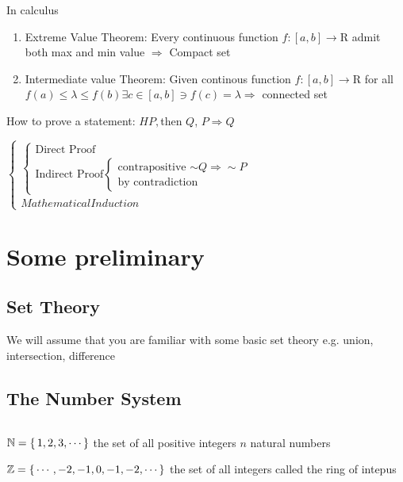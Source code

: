 


\cfoot{\thepage} %

In calculus

\begin{enumerate}
	\item Extreme Value Theorem: Every continuous function $f:[a,b]\rightarrow\mathrm{R}$ admit both max and min value $\Rightarrow$ Compact set
	\item Intermediate value Theorem: Given continous function $f:[a,b]\rightarrow \mathrm{R}$ for all $f(a) \leq \lambda \leq f(b) \exists c \in [a,b] \ni f(c) = \lambda \Rightarrow$ connected set
\end{enumerate}

How to prove a statement: $H P,$then $Q$, $P \Rightarrow Q$

$\begin{cases}
	\begin{cases}
	\text{Direct Proof}\\\text{Indirect Proof}\begin{cases}\text{contrapositive $\sim Q \Rightarrow \sim P$} \\ \text{by contradiction}\end{cases}
	\end{cases}\\
	Mathematical Induction
\end{cases}$

\section{Some preliminary}

\subsection{Set Theory}

We will assume that you are familiar with some basic set theory e.g. union, intersection, difference

\subsection{The Number System} $ $ 

$\mathbb{N}=\left\{ \,1,2,3,\cdots \,\right\}$ the set of all positive integers $n$ natural numbers

$\mathbb{Z}=\left\{ \,\cdots,-2,-1,0,-1,-2,\cdots \,\right\}$ the set of all integers called the ring of intepus

